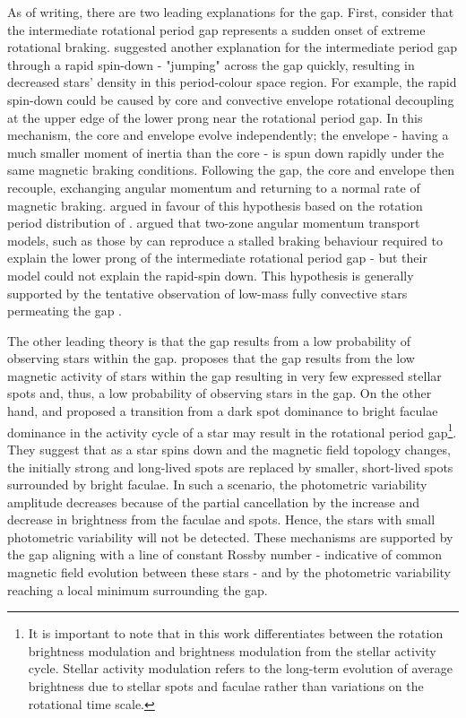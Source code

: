 As of writing, there are two leading explanations for the gap.
First, consider that the intermediate rotational period gap represents a sudden onset of extreme rotational braking.
\citep{mcquillan_rotation_2014} suggested another explanation for the intermediate period gap through a rapid spin-down - "jumping" across the gap quickly, resulting in decreased stars' density in this period-colour space region.
For example, the rapid spin-down could be caused by core and convective envelope rotational decoupling at the upper edge of the lower prong near the rotational period gap.
In this mechanism, the core and envelope evolve independently; the envelope - having a much smaller moment of inertia than the core - is spun down rapidly under the same magnetic braking conditions.
Following the gap, the core and envelope then recouple, exchanging angular momentum and returning to a normal rate of magnetic braking. 
\citet{gordon_stellar_2021} argued in favour of this hypothesis based on the rotation period distribution of \ktoo{}. 
\citet{curtis_when_2020} argued that two-zone angular momentum transport models, such as those by \citet{spada_competing_2020} can reproduce a stalled braking behaviour required to explain the lower prong of the intermediate rotational period gap - but their model could not explain the rapid-spin down.
This hypothesis is generally supported by the tentative observation of low-mass fully convective stars permeating the gap \citep{lu_bridging_2022}.

The other leading theory is that the gap results from a low probability of observing stars within the gap.
\citet{chahal_statistics_2022} proposes that the gap results from the low magnetic activity of stars within the gap resulting in very few expressed stellar spots and, thus, a low probability of observing stars in the gap.
On the other hand, \citet{reinhold_transition_2019} and \citet{reinhold_stellar_2020} proposed a transition from a dark spot dominance to bright faculae dominance in the activity cycle of a star may result in the rotational period gap\footnote{It is important to note that in this work differentiates between the rotation brightness modulation and brightness modulation from the stellar activity cycle.
Stellar activity modulation refers to the long-term evolution of average brightness due to stellar spots and faculae rather than variations on the rotational time scale.}.
They suggest that as a star spins down and the magnetic field topology changes, the initially strong and long-lived spots are replaced by smaller, short-lived spots surrounded by bright faculae.
In such a scenario, the photometric variability amplitude decreases because of the partial cancellation by the increase and decrease in brightness from the faculae and spots.
Hence, the stars with small photometric variability will not be detected.
These mechanisms are supported by the gap aligning with a line of constant Rossby number - indicative of common magnetic field evolution between these stars - and by the photometric variability reaching a local minimum surrounding the gap.

